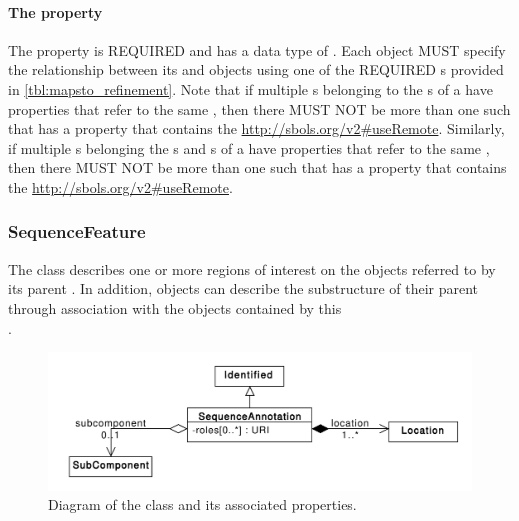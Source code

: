 \paragraph{The  property}\label{sec:refinement}
The  property is REQUIRED and has a data type of . Each  object MUST specify the relationship between its  and   objects using one of the REQUIRED  s provided in \ref{tbl:mapsto_refinement}.
Note that if multiple s belonging to the s of a  have  properties that refer to the same , then there MUST NOT be more than one such  that has a  property that contains the  \url{http://sbols.org/v2\#useRemote}. Similarly, if multiple s belonging the s and s of a  have  properties that refer to the same , then there MUST NOT be more than one such  that has a  property that contains the  \url{http://sbols.org/v2\#useRemote}.


\subsubsection{SequenceFeature}
\label{sec:SequenceFeature}
The  class describes one or more regions of interest on the  objects referred to by its parent . In addition,  objects can describe the substructure of their parent  through association with the  objects contained by this\\
.

\begin{figure}[ht]
\begin{center}
\includegraphics[scale=0.6]{uml/sequence_annotation}
\caption[]{Diagram of the  class and its associated properties.}
\label{uml:sequence_annotation}
\end{center}
\end{figure}


